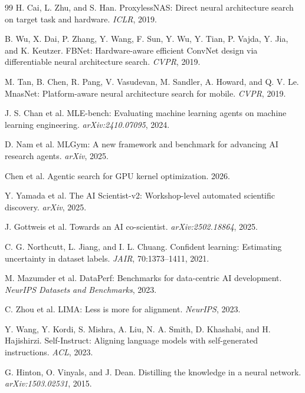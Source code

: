 \documentclass[sigconf,10pt]{acmart}
\newcommand{\TODO}[1]{\textcolor{red}{\textbf{[TODO: #1]}}}
\begin{document}
\begin{thebibliography}{99}
H. Cai, L. Zhu, and S. Han. ProxylessNAS: Direct neural architecture search on target task
and hardware. \emph{ICLR}, 2019.

B. Wu, X. Dai, P. Zhang, Y. Wang, F. Sun, Y. Wu, Y. Tian, P. Vajda, Y. Jia, and K. Keutzer.
FBNet: Hardware-aware efficient ConvNet design via differentiable neural architecture search.
\emph{CVPR}, 2019.

M. Tan, B. Chen, R. Pang, V. Vasudevan, M. Sandler, A. Howard, and Q. V. Le. MnasNet:
Platform-aware neural architecture search for mobile. \emph{CVPR}, 2019.

J. S. Chan et al. MLE-bench: Evaluating machine learning agents on machine learning
engineering. \emph{arXiv:2410.07095}, 2024.

D. Nam et al. MLGym: A new framework and benchmark for advancing AI research agents.
\emph{arXiv}, 2025. %

Chen et al. Agentic search for GPU kernel optimization. 2026. %

Y. Yamada et al. The AI Scientist-v2: Workshop-level automated scientific discovery.
\emph{arXiv}, 2025. %

J. Gottweis et al. Towards an AI co-scientist. \emph{arXiv:2502.18864}, 2025.

C. G. Northcutt, L. Jiang, and I. L. Chuang. Confident learning: Estimating uncertainty in
dataset labels. \emph{JAIR}, 70:1373--1411, 2021.

M. Mazumder et al. DataPerf: Benchmarks for data-centric AI development. \emph{NeurIPS
Datasets and Benchmarks}, 2023.

C. Zhou et al. LIMA: Less is more for alignment. \emph{NeurIPS}, 2023.

Y. Wang, Y. Kordi, S. Mishra, A. Liu, N. A. Smith, D. Khashabi, and H. Hajishirzi.
Self-Instruct: Aligning language models with self-generated instructions. \emph{ACL}, 2023.

G. Hinton, O. Vinyals, and J. Dean. Distilling the knowledge in a neural network.
\emph{arXiv:1503.02531}, 2015.


\end{thebibliography}
\end{document}
